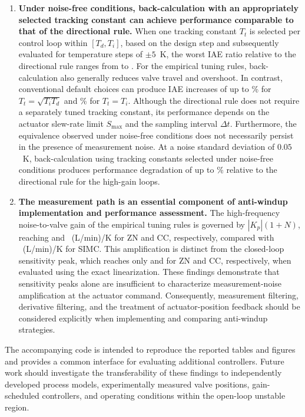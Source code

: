 \begin{enumerate}
\item \textbf{Under noise-free conditions, back-calculation with an appropriately selected tracking constant can achieve performance comparable to that of the directional rule.}
When one tracking constant $T_t$ is selected per control loop within $[T_d,T_i]$, based on the design step and subsequently evaluated for temperature steps of $\pm 5$~K, the worst IAE ratio relative to the directional rule ranges from \vttcvmin{} to \vttcvmax{}. For the empirical tuning rules, back-calculation also generally reduces valve travel and overshoot. In contrast, conventional default choices can produce IAE increases of up to \vttsqrtmaxpct{}\% for $T_t=\sqrt{T_iT_d}$ and \vtttimaxpct{}\% for $T_t=T_i$. Although the directional rule does not require a separately tuned tracking constant, its performance depends on the actuator slew-rate limit $S_{\max}$ and the sampling interval $\Delta t$. Furthermore, the equivalence observed under noise-free conditions does not necessarily persist in the presence of measurement noise. At a noise standard deviation of $0.05$~K, back-calculation using tracking constants selected under noise-free conditions produces performance degradation of up to \vnzbchimaxpct{}\% relative to the directional rule for the high-gain loops.

\item \textbf{The measurement path is an essential component of anti-windup implementation and performance assessment.}
The high-frequency noise-to-valve gain of the empirical tuning rules is governed by $|K_p|(1+N)$, reaching \vCSZN{} and \vCSCC{}~(L/min)/K for ZN and CC, respectively, compared with \vCSSIMC{}~(L/min)/K for SIMC. This amplification is distinct from the closed-loop sensitivity peak, which reaches only \vSlinZN{} and \vSlinCC{} for ZN and CC, respectively, when evaluated using the exact linearization. These findings demonstrate that sensitivity peaks alone are insufficient to characterize measurement-noise amplification at the actuator command. Consequently, measurement filtering, derivative filtering, and the treatment of actuator-position feedback should be considered explicitly when implementing and comparing anti-windup strategies.

\end{enumerate}

The accompanying code is intended to reproduce the reported tables and figures and provides a common interface for evaluating additional controllers. Future work should investigate the transferability of these findings to independently developed process models, experimentally measured valve positions, gain-scheduled controllers, and operating conditions within the open-loop unstable region.
